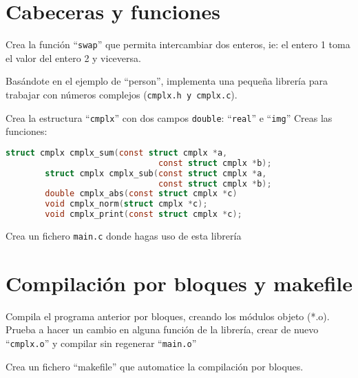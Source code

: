 \documentclass{tareas}
\begin{document}
\maketitle
\newpage
\tableofcontents
{}
\newpage

\section{Cabeceras y funciones}

\begin{problem}[Swap]
\begin{statement}
	Crea la función ``\texttt{swap}'' que permita intercambiar dos enteros,
	ie: el entero 1 toma el valor del entero 2 y viceversa.
\end{statement}
\end{problem}

\begin{problem}[Complejos]
\begin{statement}
	Basándote en el ejemplo de ``person'', implementa una pequeña librería
	para trabajar con números complejos (\texttt{cmplx.h y cmplx.c}).

	\subp Crea la estructura ``\texttt{cmplx}'' con dos campos
	\texttt{double}: ``\texttt{real}'' e ``\texttt{img}''
	\subp Creas las funciones:
	\begin{lstlisting}[frame=none, numbers=none, language=C]
		struct cmplx cmplx_sum(const struct cmplx *a,
		                       const struct cmplx *b);
		struct cmplx cmplx_sub(const struct cmplx *a,
		                       const struct cmplx *b);
		double cmplx_abs(const struct cmplx *c)
		void cmplx_norm(struct cmplx *c);
		void cmplx_print(const struct cmplx *c);
	\end{lstlisting}
	\subp Crea un fichero \texttt{main.c} donde hagas uso de esta librería
\end{statement}
\end{problem}

\section{Compilación por bloques y makefile}
\begin{problem}
\begin{statement}
	\subp Compila el programa anterior por bloques, creando los módulos
	objeto (*.o).
	\subp Prueba a hacer un cambio en alguna función de la librería, crear
	de nuevo ``\texttt{cmplx.o}'' y compilar sin regenerar
	``\texttt{main.o}''
\end{statement}
\end{problem}

\begin{problem}
\begin{statement}
	Crea un fichero ``makefile'' que automatice la compilación por bloques.
\end{statement}
\end{problem}
\end{document}
